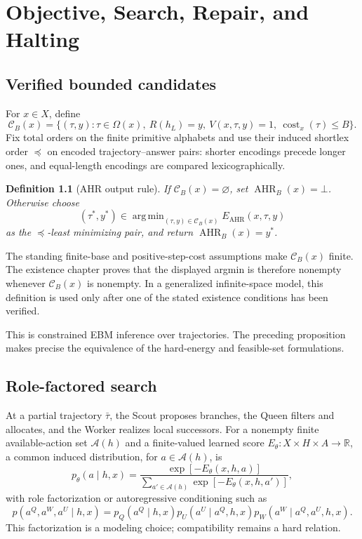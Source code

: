 \documentclass[11pt,oneside]{book}
\newtheorem{definition}{Definition}[chapter]
\theoremstyle{remark}
\newcommand{\AHR}{\operatorname{AHR}}
\newcommand{\Om}{\Omega}
\newcommand{\cB}{\mathcal C_B}
\DeclareMathOperator*{\argmin}{arg\,min}
\DeclareMathOperator{\cost}{cost}
\begin{document}
\chapter{Objective, Search, Repair, and Halting}

\section{Verified bounded candidates}

For $x\in X$, define
\[
\cB(x)=\{(\tau,y):\tau\in\Om(x),\ R(h_L)=y,\ V(x,\tau,y)=1,\ \cost_x(\tau)\le B\}.
\]
Fix total orders on the finite primitive alphabets and use their induced
shortlex order $\preceq$ on encoded trajectory--answer pairs: shorter
encodings precede longer ones, and equal-length encodings are compared
lexicographically.

\begin{definition}[AHR output rule]
If $\cB(x)=\varnothing$, set $\AHR_B(x)=\bot$. Otherwise choose
\[
(\tau^*,y^*)\in\argmin_{(\tau,y)\in\cB(x)}E_{\mathrm{AHR}}(x,\tau,y)
\]
as the $\preceq$-least minimizing pair, and return $\AHR_B(x)=y^*$.
\end{definition}

The standing finite-base and positive-step-cost assumptions make
$\cB(x)$ finite. The existence chapter proves that the displayed argmin is
therefore nonempty whenever $\cB(x)$ is nonempty. In a generalized
infinite-space model, this definition is used only after one of the stated
existence conditions has been verified.

This is constrained EBM inference over trajectories. The preceding proposition
makes precise the equivalence of the hard-energy and feasible-set formulations.

\section{Role-factored search}

At a partial trajectory $\bar\tau$, the Scout proposes branches, the Queen
filters and allocates, and the Worker realizes local successors. For a
nonempty finite available-action set $\mathcal A(h)$ and a finite-valued
learned score $E_\theta:X\times H\times A\to\mathbb R$, a common induced
distribution, for $a\in\mathcal A(h)$, is
\[
p_\theta(a\mid h,x)=\frac{\exp[-E_\theta(x,h,a)]}
{\sum_{a'\in\mathcal A(h)}\exp[-E_\theta(x,h,a')]},
\]
with role factorization or autoregressive conditioning such as
\[
p(a^Q,a^W,a^U\mid h,x)
=p_Q(a^Q\mid h,x)
p_U(a^U\mid a^Q,h,x)
p_W(a^W\mid a^Q,a^U,h,x).
\]
This factorization is a modeling choice; compatibility remains a hard relation.
\end{document}
